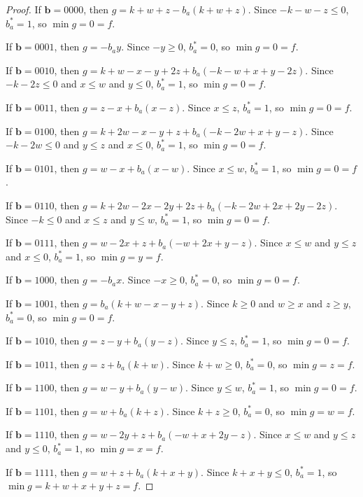 \documentclass[11pt]{scrartcl}
\newcommand{\vc}[1]{\boldsymbol{#1}}
\begin{document}
\begin{proof}
If $\vc b = 0000$, then $g = k + w + z - b_a(k + w + z)$.
Since $-k - w - z \le 0$, $b_a^* = 1$, so $\min g = 0 = f$.

If $\vc b = 0001$, then $g = -b_ay$.
Since $-y \ge 0$, $b_a^* = 0 $, so $\min g = 0 = f$.

If $\vc b = 0010$, then $g = k + w - x - y + 2z + b_a(-k - w + x + y - 2z)$.
Since $-k - 2z \le 0$ and $x \le w$ and $ y \le 0$, $b_a^* = 1$, so $\min g = 0 = f$.

If $\vc b = 0011$, then $g = z - x + b_a(x - z)$.
Since $x \le z$, $b_a^* = 1$, so $\min g = 0 = f$.

If $\vc b = 0100$, then $g = k + 2w - x - y + z + b_a(-k - 2w + x + y - z)$.
Since $-k - 2w \le 0$ and $y \le z$ and $x \le 0$, $b_a^* = 1$, so $\min g = 0 = f$.

If $\vc b = 0101$, then $g = w - x + b_a(x - w)$.
Since $x \le w$, $b_a^* = 1$, so $\min g = 0 = f$.

If $\vc b = 0110$, then $g = k + 2w - 2x - 2y + 2z + b_a(-k -2w + 2x + 2y - 2z)$.
Since $-k \le 0$ and $x \le z$ and $y \le w$, $b_a^* = 1$, so $\min g = 0 = f$.

If $\vc b = 0111$, then $g = w - 2x + z + b_a(-w + 2x + y - z)$.
Since $x \le w$ and $y \le z$ and $x \le 0$, $b_a^* = 1$, so $\min g = y = f$.

If $\vc b = 1000$, then $g = -b_ax$.
Since $-x \ge 0$, $b_a^* = 0$, so $\min g = 0 = f$.

If $\vc b = 1001$, then $g = b_a(k + w - x - y + z)$.
Since $k \ge 0$ and $w \ge x $ and $z \ge y$, $b_a^* = 0$, so $\min g = 0 = f$.

If $\vc b = 1010$, then $g = z - y + b_a(y - z)$.
Since $y \le z$, $b_a^* = 1$, so $\min g = 0 = f$.

If $\vc b = 1011$, then $g = z + b_a(k + w)$.
Since $k + w \ge 0$, $b_a^* = 0$, so $\min g = z = f$.

If $\vc b = 1100$, then $g = w - y + b_a(y -w)$.
Since $y \le w$, $b_a^* = 1$, so $\min g = 0 = f$.

If $\vc b = 1101$, then $g = w + b_a(k + z)$.
Since $k+z \ge 0$, $b_a^* = 0 $, so $\min g = w = f$.

If $\vc b = 1110$, then $g = w - 2y + z + b_a(-w + x + 2y - z)$.
Since $x \le w$ and $ y \le z$ and $y \le 0$, $b_a^* = 1$, so $\min g = x =f $.

If $\vc b = 1111$, then $g = w + z + b_a(k + x + y)$.
Since $k+x + y \le 0$, $b_a^* = 1$, so $\min g = k + w + x + y + z = f$.
\end{proof}
\end{document}
